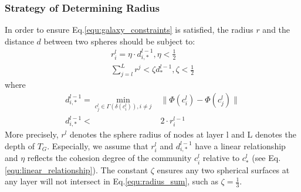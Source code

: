 \documentclass{article}
\theoremstyle{definition}
\begin{document}
	 \subsubsection{Strategy of Determining Radius}
	 In order to ensure Eq.\ref{equ:galaxy_constraints} is satisfied, the radius $r$ and the distance $d$ between two spheres should be subject to:
	 \begin{align}
	 	\label{equ:linear_relationship}
	 	r_i^l = \eta \cdot d_{i,*}^{l-1}, \eta < \frac{1}{2} \\
	 	\label{equ:radius_sum}
	 	\sum_{j=l}^L r^j < \zeta d_*^{l-1}, \zeta < \frac{1}{2}   
	 \end{align}
	 where 
	 \begin{align}
	 	d_{i,*}^{l-1} = \min_{c^{l}_j \in \Gamma(\delta(c^{l}_i)), i \neq j}& \lVert\Phi(c_i^{l}) - \Phi(c_j^{l})\rVert \\
	 	\label{equ:d_and_r}
	 	d_{i,*}^{l-1} <& 2 \cdot r_i^{l-1}
	 \end{align}
	 More precisely, $r^l$ denotes the sphere radius of nodes at layer l and L denotes the depth of $T_G$. Especially, we assume that $r_i^l$ and $d_{i,*}^{l-1}$ have a linear relationship and $\eta$ reflects the cohesion degree of the community $c_i^l$ relative to $c_*^l$ (see Eq.\ref{equ:linear_relationship}). The constant $\zeta$ ensures any two spherical surfaces at any layer will not intersect in Eq.\ref{equ:radius_sum}, such as $\zeta=\frac{1}{3}$.
\end{document}
